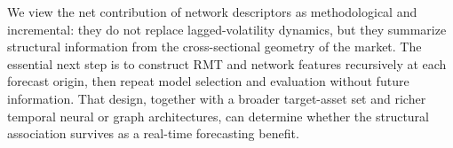 We view the net contribution of network descriptors as methodological and incremental: they do not replace lagged-volatility dynamics, but they summarize structural information from the cross-sectional geometry of the market. The essential next step is to construct RMT and network features recursively at each forecast origin, then repeat model selection and evaluation without future information. That design, together with a broader target-asset set and richer temporal neural or graph architectures, can determine whether the structural association survives as a real-time forecasting benefit.
